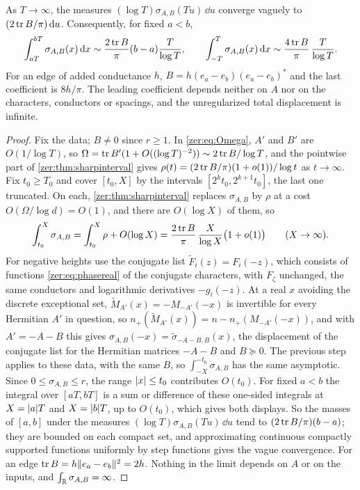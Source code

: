 \begin{corollary}\label{zer:thm:transport}
As $T\to\infty$, the measures $(\log T)\sigma_{A,B}(Tu)\,\dd u$ converge vaguely to
$(2\operatorname{tr} B/\pi)\,\mathrm{d} u$. Consequently, for fixed
$a<b$,
\[
 \int_{aT}^{bT}\sigma_{A,B}(x)\,\mathrm{d} x\sim\frac{2\operatorname{tr} B}\pi(b-a)\frac T{\log T},\qquad
 \int_{-T}^T\sigma_{A,B}(x)\,\mathrm{d} x\sim\frac{4\operatorname{tr} B}\pi\,\frac T{\log T}.
\]
For an edge of added conductance $h$, $B=h(e_a-e_b)(e_a-e_b)^*$ and the last coefficient is $8h/\pi$.
The leading coefficient depends neither on $A$ nor on the characters, conductors or spacings, and
the unregularized total displacement is infinite.
\end{corollary}
\begin{proof}
Fix the data; $B\ne0$ since $r\ge1$. In \eqref{zer:eq:Omega}, $A'$ and $B'$ are $O(1/\log T)$, so
$\Omega=\operatorname{tr} B'(1+O((\log T)^{-2}))\sim2\operatorname{tr} B/\log T$, and the pointwise part of \cref{zer:thm:sharpinterval}
gives $\rho(t)=(2\operatorname{tr} B/\pi)(1+o(1))/\log t$ as $t\to\infty$. Fix $t_0\ge T_0$ and cover $[t_0,X]$ by the
intervals $[2^kt_0,2^{k+1}t_0]$, the last one truncated. On each, \cref{zer:thm:sharpinterval} replaces
$\sigma_{A,B}$ by $\rho$ at a cost $O(\Omega/\log d)=O(1)$, and there are $O(\log X)$ of them, so
\[
 \int_{t_0}^X\sigma_{A,B}=\int_{t_0}^X\rho+O(\log X)=\frac{2\operatorname{tr} B}\pi\,\frac X{\log X}\bigl(1+o(1)\bigr)\qquad(X\to\infty).
\]
For negative heights use the conjugate list $\widetilde F_i(z)=F_i(-z)$, which consists of functions
\eqref{zer:eq:phasereal} of the conjugate characters, with $F_\zeta$ unchanged, the same conductors and
logarithmic derivatives $-g_i(-z)$. At a real $x$ avoiding the discrete exceptional set,
$\widetilde M_{A'}(x)=-M_{-A'}(-x)$ is invertible for every Hermitian $A'$ in question, so
$n_+(\widetilde M_{A'}(x))=n-n_+(M_{-A'}(-x))$, and with $A'=-A-B$ this gives
$\sigma_{A,B}(-x)=\widetilde\sigma_{-A-B,B}(x)$, the displacement of the conjugate list for the Hermitian
matrices $-A-B$ and $B\succeq0$. The previous step applies to these data, with the same $B$, so
$\int_{-X}^{-t_0}\sigma_{A,B}$ has the same asymptotic. Since $0\le\sigma_{A,B}\le r$, the range $\lvert x\rvert\le t_0$
contributes $O(t_0)$. For fixed $a<b$ the integral over $[aT,bT]$ is a sum or difference of these
one-sided integrals at $X=\lvert a\rvert T$ and $X=\lvert b\rvert T$, up to $O(t_0)$, which gives both displays. So the
masses of $[a,b]$ under the measures $(\log T)\sigma_{A,B}(Tu)\,\dd u$ tend to $(2\operatorname{tr} B/\pi)(b-a)$; they are
bounded on each compact set, and approximating continuous compactly supported functions uniformly by
step functions gives the vague convergence. For an edge $\operatorname{tr} B=h\lVert e_a-e_b\rVert^2=2h$. Nothing in the
limit depends on $A$ or on the inputs, and $\int_{\mathbb{R}}\sigma_{A,B}=\infty$.
\end{proof}

